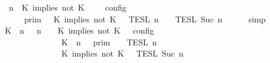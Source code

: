 \begin{isabellebody}
%
\isadelimproof
%
\endisadelimproof
%
\isatagproof
{}\isamarkupfalse%
\ {\isacharminus}\isanewline
\ \ \isamarkupfalse%
\ {\isacartoucheopen}{\isasymlbrakk}\ {\isasymGamma}{\isacharcomma}\ n\ {\isasymturnstile}\ {\isacharparenleft}K\ implies\ not\ K\ {\isacharhash}\ {\isasymPsi}\ {\isasymtriangleright}\ {\isasymPhi}\ {\isasymrbrakk}\isactrlsub c\isactrlsub o\isactrlsub n\isactrlsub f\isactrlsub i\isactrlsub g\isanewline
\ \ \ \ \ \ \ \ {\isacharequal}\ {\isasymlbrakk}{\isasymlbrakk}\ {\isasymGamma}\ {\isasymrbrakk}{\isasymrbrakk}\isactrlsub p\isactrlsub r\isactrlsub i\isactrlsub m\ {\isasyminter}\ {\isasymlbrakk}{\isasymlbrakk}\ {\isacharparenleft}K\ implies\ not\ K\ {\isacharhash}\ {\isasymPsi}\ {\isasymrbrakk}{\isasymrbrakk}\isactrlsub T\isactrlsub E\isactrlsub S\isactrlsub L\isactrlbsup {\isasymge}\ n\isactrlesup \ {\isasyminter}\ {\isasymlbrakk}{\isasymlbrakk}\ {\isasymPhi}\ {\isasymrbrakk}{\isasymrbrakk}\isactrlsub T\isactrlsub E\isactrlsub S\isactrlsub L\isactrlbsup {\isasymge}\ Suc\ n\isactrlesup {\isacartoucheclose}\isanewline
\ \ \ \ \isamarkupfalse%
\ simp\isanewline
\ \ \isamarkupfalse%
\ \isamarkupfalse%
\ {\isacartoucheopen}{\isasymlbrakk}\ {\isacharparenleft}{\isacharparenleft}K\ {\isasymnot}{\isasymUp}\ n{\isacharparenright}\ {\isacharhash}\ {\isasymGamma}{\isacharparenright}{\isacharcomma}\ n\ {\isasymturnstile}\ {\isasymPsi}\ {\isasymtriangleright}\ {\isacharparenleft}{\isacharparenleft}K\ implies\ not\ K\ {\isacharhash}\ {\isasymPhi}{\isacharparenright}\ {\isasymrbrakk}\isactrlsub c\isactrlsub o\isactrlsub n\isactrlsub f\isactrlsub i\isactrlsub g\isanewline
\ \ \ \ \ \ \ \ \ \ \ \ \ \ \ \ \ \ {\isacharequal}\ {\isasymlbrakk}{\isasymlbrakk}\ {\isacharparenleft}K\ {\isasymnot}{\isasymUp}\ n{\isacharparenright}\ {\isacharhash}\ {\isasymGamma}\ {\isasymrbrakk}{\isasymrbrakk}\isactrlsub p\isactrlsub r\isactrlsub i\isactrlsub m\ {\isasyminter}\ {\isasymlbrakk}{\isasymlbrakk}\ {\isasymPsi}\ {\isasymrbrakk}{\isasymrbrakk}\isactrlsub T\isactrlsub E\isactrlsub S\isactrlsub L\isactrlbsup {\isasymge}\ n\isactrlesup \isanewline
\ \ \ \ \ \ \ \ \ \ \ \ \ \ \ \ \ \ {\isasyminter}\ {\isasymlbrakk}{\isasymlbrakk}\ {\isacharparenleft}K\ implies\ not\ K\ {\isacharhash}\ {\isasymPhi}\ {\isasymrbrakk}{\isasymrbrakk}\isactrlsub T\isactrlsub E\isactrlsub S\isactrlsub L\isactrlbsup {\isasymge}\ Suc\ n\isactrlesup {\isacartoucheclose}\ \isamarkupfalse%

\end{isabellebody}
